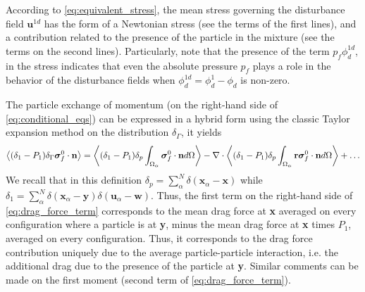 According to \ref{eq:equivalent_stress}, the mean stress governing the disturbance field $\textbf{u}^{1d}$ has the form of a Newtonian stress (see the terms of the first lines), and a contribution related to the presence of the particle in the mixture (see the terms on the second lines). 
Particularly, note that the presence of the term $p_f \phi_d^{1d}$, in the stress indicates that even the absolute pressure $p_f$ plays a role in the behavior of the disturbance fields when $\phi_d^{1d} = \phi_d^1 - \phi_d$ is non-zero. 


The particle exchange of momentum (on the right-hand side of \ref{eq:conditional_eqs}) can be expressed in a hybrid form using the classic Taylor expansion method on the distribution $\delta_\Gamma$, it yields 
\begin{equation}
    \avg{ (\delta_1 - P_1) \delta_\Gamma \bm\sigma_f^0\cdot \textbf{n}}
    = \avg{ (\delta_1 - P_1) \delta_p \intO{\bm\sigma_f^0\cdot \textbf{n}}}
    - \div \avg{ (\delta_1 - P_1) \delta_p \intO{\textbf{r}\bm\sigma_f^0\cdot \textbf{n}}}
    + \ldots
    \label{eq:drag_force_term}
\end{equation}
We recall that in this definition $\delta_p = \sum_\alpha^N\delta(\textbf{x}_\alpha - \textbf{x})$ while $\delta_1 = \sum_\alpha^N\delta(\textbf{x}_\alpha - \textbf{y})\delta(\textbf{u}_\alpha - \textbf{w})$.  
Thus, the first term on the right-hand side of \ref{eq:drag_force_term} corresponds to the mean drag force at \textbf{x} averaged on every configuration where a particle is at \textbf{y}, minus the mean drag force at \textbf{x} times $P_1$, averaged on every configuration. 
Thus, it corresponds to the drag force contribution uniquely due to the average particle-particle interaction, i.e. the additional drag due to the presence of the particle at \textbf{y}. 
Similar comments can be made on the first moment (second term of \ref{eq:drag_force_term}). 


